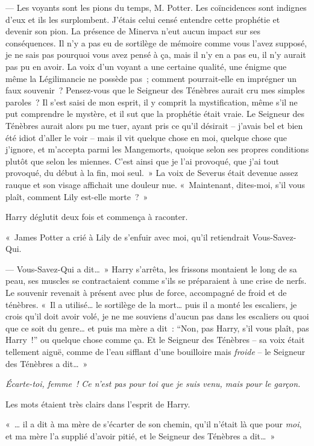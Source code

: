 --- Les voyants sont les pions du temps, M. Potter. Les coïncidences sont indignes d'eux et ils les surplombent. J'étais celui censé entendre cette prophétie et devenir son pion. La présence de Minerva n'eut aucun impact sur ses conséquences. Il n'y a pas eu de sortilège de mémoire comme vous l'avez supposé, je ne sais pas pourquoi vous avez pensé à ça, mais il n'y en a pas eu, il n'y aurait pas pu en avoir. La voix d'un voyant a une certaine qualité, une énigme que même la Légilimancie ne possède pas~; comment pourrait-elle en imprégner un faux souvenir~? Pensez-vous que le Seigneur des Ténèbres aurait cru mes simples paroles~? Il s'est saisi de mon esprit, il y comprit la mystification, même s'il ne put comprendre le mystère, et il sut que la prophétie était vraie. Le Seigneur des Ténèbres aurait alors pu me tuer, ayant pris ce qu'il désirait -- j'avais bel et bien été idiot d'aller le voir -- mais il vit quelque chose en moi, quelque chose que j'ignore, et m'accepta parmi les Mangemorts, quoique selon ses propres conditions plutôt que selon les miennes. C'est ainsi que je l'ai provoqué, que j'ai tout provoqué, du début à la fin, moi seul.~» La voix de Severus était devenue assez rauque et son visage affichait une douleur nue. «~Maintenant, dites-moi, s'il vous plaît, comment Lily est-elle morte~?~»

Harry déglutit deux fois et commença à raconter.

«~James Potter a crié à Lily de s'enfuir avec moi, qu'il retiendrait Vous-Savez-Qui.

--- Vous-Savez-Qui a dit…~» Harry s'arrêta, les frissons montaient le long de sa peau, ses muscles se contractaient comme s'ils se préparaient à une crise de nerfs. Le souvenir revenait à présent avec plus de force, accompagné de froid et de ténèbres. «~Il a utilisé… le sortilège de la mort… puis il a monté les escaliers, je crois qu'il doit avoir volé, je ne me souviens d'aucun pas dans les escaliers ou quoi que ce soit du genre… et puis ma mère a dit~: “Non, pas Harry, s'il vous plaît, pas Harry~!” ou quelque chose comme ça. Et le Seigneur des Ténèbres -- sa voix était tellement aiguë, comme de l'eau sifflant d'une bouilloire mais \emph{froide} -- le Seigneur des Ténèbres a dit…~»

\emph{Écarte-toi, femme~! Ce n'est pas pour toi que je suis venu, mais pour le garçon.}

Les mots étaient très clairs dans l'esprit de Harry.

«~… il a dit à ma mère de s'écarter de son chemin, qu'il n'était là que pour \emph{moi}, et ma mère l'a supplié d'avoir pitié, et le Seigneur des Ténèbres a dit…~»

